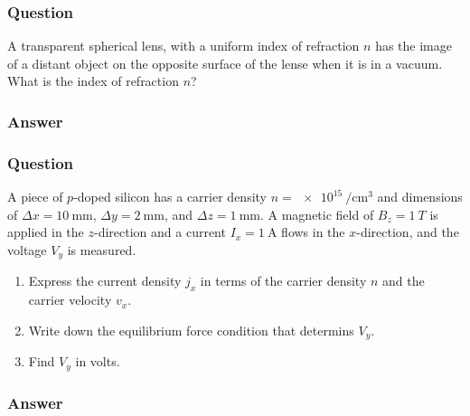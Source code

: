 \subsubsection{Question}

A transparent spherical lens, with a uniform index of refraction $n$ has the
image of a distant object on the opposite surface of the lense when it is in
a vacuum. What is the index of refraction $n$?

\subsubsection{Answer}

\subsubsection{Question}

A piece of $p$-doped silicon has a carrier density
$n=\SI[per-mode=reciprocal]{e15}{\per\cm\cubed}$ and dimensions of $Δx =
\SI{10}{\mm}$, $Δy = \SI{2}{\mm}$, and $Δz = \SI{1}{\mm}$. A magnetic field
of $B_z = \SI{1}{T}$ is applied in the $z$-direction and a current $I_x =
\SI{1}{\A}$ flows in the $x$-direction, and the voltage $V_y$ is measured.
\begin{enumerate}
	\item
		Express the current density $j_x$ in terms of the carrier density $n$
		and the carrier velocity $v_x$.
	\item
		Write down the equilibrium force condition that determins $V_y$.
	\item
		Find $V_y$ in volts.
\end{enumerate}

\subsubsection{Answer}

